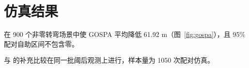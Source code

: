 \section{仿真结果}
\method 在 900 个非零转弯场景中使 GOSPA 平均降低 61.92 m（图~\ref{fig:gospa}），且 95\% 配对自助区间不包含零。

与 \gtmethod 的补充比较在同一批阈后观测上进行，样本量为 1050 次配对仿真。

